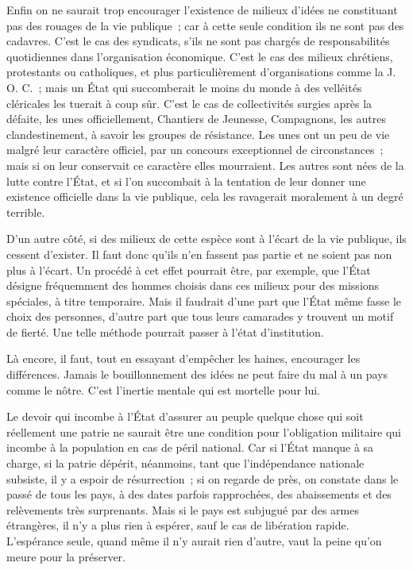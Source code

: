 \documentclass[french,twoside]{book} %
\begin{document}
Enfin on ne saurait trop encourager l'existence de milieux d'idées ne constituant pas des rouages de la vie publique ; car à cette seule condition ils ne sont pas des cadavres. C'est le cas des syndicats, s'ils ne sont pas chargés de responsabilités quotidiennes dans l'organisation économique. C'est le cas des milieux chrétiens, protestants ou catholiques, et plus particulièrement d'organisations comme la J. O. C. ; mais un État qui succomberait le moins du monde à des velléités cléricales les tuerait à coup sûr. C'est le cas de collectivités surgies après la défaite, les unes officiellement, Chantiers de Jeunesse, Compagnons, les autres clandestinement, à savoir les groupes de résistance. Les unes ont un peu de vie malgré leur caractère officiel, par un concours exceptionnel de circonstances ; mais si on leur conservait ce caractère elles mourraient. Les autres sont nées de la lutte contre l'État, et si l'on succombait à la tentation de leur donner une existence officielle dans la vie publique, cela les ravagerait moralement à un degré terrible.\par
D'un autre côté, si des milieux de cette espèce sont à l'écart de la vie publique, ils cessent d'exister. Il faut donc qu'ils n'en fassent pas partie et ne soient pas non plus à l'écart. Un procédé à cet effet pourrait être, par exemple, que l'État désigne fréquemment des hommes choisis dans ces milieux pour des missions spéciales, à titre temporaire. Mais il faudrait d'une part que l'État même fasse le choix des personnes, d'autre part que tous leurs camarades y trouvent un motif de fierté. Une telle méthode pourrait passer à l'état d'institution.\par
Là encore, il faut, tout en essayant d'empêcher les haines, encourager les différences. Jamais le bouillonnement des idées ne peut faire du mal à un pays comme le nôtre. C'est l'inertie mentale qui est mortelle pour lui.\par
Le devoir qui incombe à l'État d'assurer au peuple quelque chose qui soit réellement une patrie ne saurait être une condition pour l'obligation militaire qui incombe à la population en cas de péril national. Car si l'État manque à sa charge, si la patrie dépérit, néanmoins, tant que l'indépendance nationale subsiste, il y a espoir de résurrection ; si on regarde de près, on constate dans le passé de tous les pays, à des dates parfois rapprochées, des abaissements et des relèvements très surprenants. Mais si le pays est subjugué par des armes étrangères, il n'y a plus rien à espérer, sauf le cas de libération rapide. L'espérance seule, quand même il n'y aurait rien d'autre, vaut la peine qu'on meure pour la préserver.\par
\end{document}
